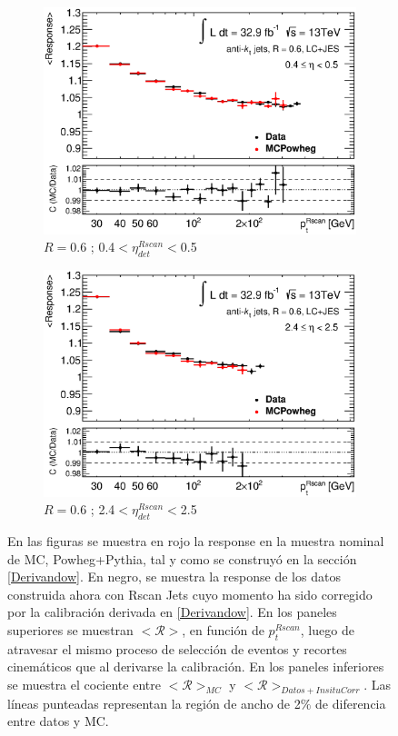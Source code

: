 \begin{figure}[ht]
\begin{subfigure}[b]{0.495\textwidth}
        \centering
        \includegraphics[width=\textwidth]{images/Closure6LC_49}
        \caption{$R=$0.6 ; 0.4$<\eta^{Rscan}_{det}<$0.5}
    \end{subfigure}
    \hfill
    \begin{subfigure}[b]{0.495\textwidth}
        \centering
        \includegraphics[width=\textwidth]{images/Closure6LC_69}
        \caption{$R=$0.6 ; 2.4$<\eta^{Rscan}_{det}<$2.5}
    \end{subfigure}
    \caption{ En las figuras se muestra en rojo la response en la muestra nominal de MC, Powheg+Pythia, tal y como se construyó en la sección \ref{Derivandow}. En negro, se muestra la response de los datos construida ahora con Rscan Jets cuyo momento ha sido corregido por la calibración derivada en \ref{Derivandow}. En los paneles superiores se muestran $<\mathcal{R}>$, en función de $p_t^{Rscan}$, luego de atravesar el mismo proceso de selección de eventos y recortes cinemáticos que al derivarse la calibración. En los paneles inferiores se muestra el cociente entre $<\mathcal{R}>_{MC}$ y $<\mathcal{R}>_{Datos+InsituCorr}$. Las líneas punteadas representan la región de ancho de 2$\%$ de diferencia entre datos y MC.}
    \label{fig:Closure}
\end{figure}


